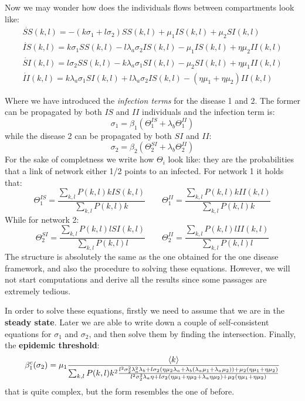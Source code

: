 \documentclass[../main/main.tex]{subfiles}
\begin{document}
Now we may wonder how does the individuals flows between compartments look like:
\begin{align}
    \dot{SS}(k,l) = - (k \sigma_1 + l\sigma_2) SS(k,l) + \mu_1 IS(k,l) + \mu_2 SI (k,l)\\
    \dot{IS}(k,l) = k\sigma_1 SS(k,l) - l \lambda_a \sigma_2 IS(k,l) - \mu_1 IS(k,l) + \eta \mu_2 II(k,l)\\
    \dot{SI}(k,l) = l\sigma_2SS(k,l) - k \lambda_a \sigma_1 SI(k,l) - \mu_2 SI(k,l) + \eta \mu_1 II(k,l)\\
    \dot{II}(k,l) = k\lambda_a\sigma_1SI(k,l) + l \lambda_a \sigma_2 IS(k,l) - (\eta \mu_1 + \eta \mu_2) II(k,l)
\end{align}

Where we have introduced the \textit{infection terms} for the disease 1 and 2. The former can be propagated by both $IS$ and $II$ individuals and the infection term is:
\begin{equation*}
    \sigma_1 = \beta_1 (\Theta_1^{IS} + \lambda_b \Theta_1^{II} )
\end{equation*}
while the disease 2 can be propagated by both $SI$ and $II$:
\begin{equation*}
    \sigma_2 = \beta_2 (\Theta_2^{SI} + \lambda_b \Theta_2^{II} )
\end{equation*}
For the sake of completness we write how $\Theta_i$ look like: they are the probabilities that a link of network either 1/2 points to an infected. For network 1 it holds that:
\begin{equation*}
    \Theta_1^{IS} = \frac{\sum_{k,l} P(k,l) k IS(k,l)}{\sum_{k,l} P(k,l) k}
    \qquad
    \Theta_1^{II} = \frac{\sum_{k,l} P(k,l) k II(k,l)}{\sum_{k,l} P(k,l) k}
\end{equation*}
While for network 2:
\begin{equation*}
    \Theta_2^{SI} = \frac{\sum_{k,l} P(k,l) l SI(k,l)}{\sum_{k,l} P(k,l) l}
    \qquad
    \Theta_2^{II} = \frac{\sum_{k,l} P(k,l) l II(k,l)}{\sum_{k,l} P(k,l) l}
\end{equation*}
The structure is absolutely the same as the one obtained for the one disease framework, and also the procedure to solving these equations. However, we will not start computations and derive all the results since some passages are extremely tedious.

In order to solve these equations, firstly we need to assume that we are in the \textbf{steady state}. Later we are able to write down a couple of self-consistent equations for \( \sigma _1 \) and \( \sigma _2 \), and then solve them by finding the intersection. Finally, the \textbf{epidemic threshold}:
\begin{equation*}
  \beta_1^c( \sigma_2) = \mu_1 \frac{\expval{k}}{\sum_{k,l} P(k,l) k^2 \frac{l^2 \sigma_2^2 \lambda_a^2 \lambda_b + l\sigma_2(\eta \mu_2 \lambda_a  + \lambda_b(\lambda_a \mu_1 + \lambda_a \mu_2)) + \mu_2 ( \eta \mu_1 + \eta \mu_2)}{l^2 \sigma_2^2 \lambda_a \eta + l \sigma_2 (\eta \mu_1 + \eta \mu_2 + \lambda_a \eta \mu_2) + \mu_2(\eta \mu_1 + \eta \mu_2)}}
\end{equation*}
that is quite complex, but the form resembles the one of before.
\end{document}
